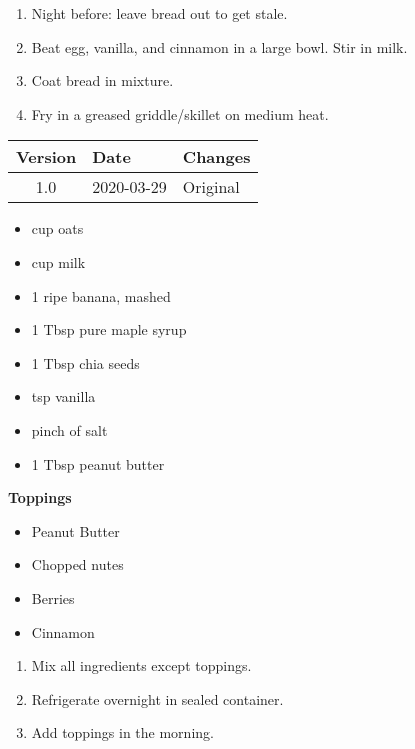 \instructions
\begin{enumerate}
    \item Night before: leave bread out to get stale.
    \item Beat egg, vanilla, and cinnamon in a large bowl. Stir in milk.
    \item Coat bread in mixture.
    \item Fry in a greased griddle/skillet on medium heat.
\end{enumerate}

\vfill

\begin{tabular}{ c | l | l }
  \textbf{Version} & \textbf{Date} & \textbf{Changes} \\ 
  \hline		
  1.0 & 2020-03-29 & Original \\
\end{tabular}



\ingredients
\begin{multicols}{2}
\raggedcolumns %
\begin{itemize}
    \item {} cup oats
    \item {} cup milk
    \item 1 ripe banana, mashed
    \item 1 Tbsp pure maple syrup
    \item 1 Tbsp chia seeds
    \item {} tsp vanilla
    \item pinch of salt
    \item 1 Tbsp peanut butter
\end{itemize}
\columnbreak
\textbf{Toppings}
\begin{itemize}
    \item Peanut Butter
    \item Chopped nutes
    \item Berries
    \item Cinnamon
\end{itemize}
\end{multicols}

\instructions
\begin{enumerate}
    \item Mix all ingredients except toppings.
    \item Refrigerate overnight in sealed container.
    \item Add toppings in the morning.
\end{enumerate}

